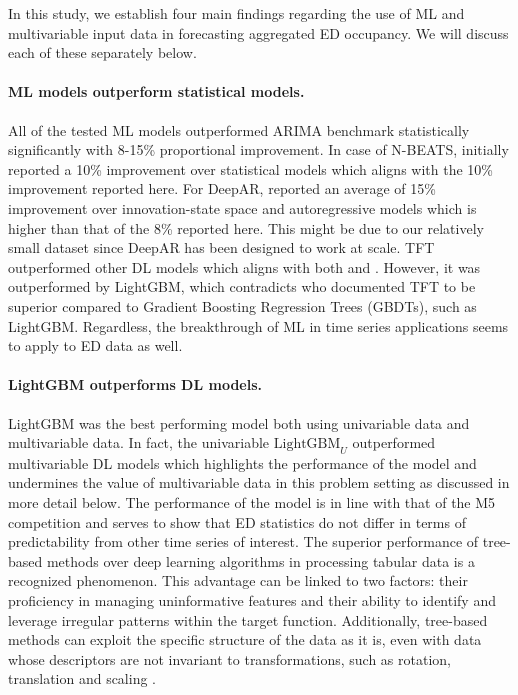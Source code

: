 In this study, we establish four main findings regarding the use of ML and multivariable input data in forecasting aggregated ED occupancy. We will discuss each of these separately below.

\paragraph{ML models outperform statistical models.} All of the tested ML models outperformed ARIMA benchmark statistically significantly with 8-15\% proportional improvement. In case of N-BEATS, \citet{Oreshkin2019} initially reported a 10\% improvement over statistical models which aligns with the 10\% improvement reported here. For DeepAR, \citet{Salinas2020} reported an average of 15\% improvement over innovation-state space and autoregressive models which is higher than that of the 8\% reported here. This might be due to our relatively small dataset since DeepAR has been designed to work at scale. TFT outperformed other DL models which aligns with both \citet{Lim2021} and \citet{Elsayed2021}. However, it was outperformed by LightGBM, which contradicts \citet{Elsayed2021} who documented TFT to be superior compared to Gradient Boosting Regression Trees (GBDTs), such as LightGBM. Regardless, the breakthrough of ML in time series applications seems to apply to ED data as well.

\paragraph{LightGBM outperforms DL models.} LightGBM was the best performing model both using univariable data and multivariable data. In fact, the univariable $\text{LightGBM}_U$ outperformed multivariable DL models which highlights the performance of the model and undermines the value of multivariable data in this problem setting as discussed in more detail below. The performance of the model is in line with that of the M5 competition \cite{Makridakis2022} and serves to show that ED statistics do not differ in terms of predictability from other time series of interest. The superior performance of tree-based methods over deep learning algorithms in processing tabular data is a recognized phenomenon. This advantage can be linked to two factors: their proficiency in managing uninformative features and their ability to identify and leverage irregular patterns within the target function. Additionally, tree-based methods can exploit the specific structure of the data as it is, even with data whose descriptors are not invariant to transformations, such as rotation, translation and scaling \cite{Grinsztajn2022}.

